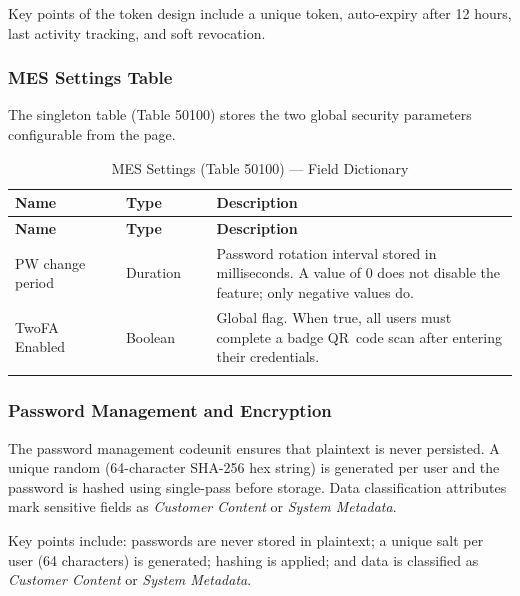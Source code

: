 Key points of the token design include a unique  token,
auto-expiry after 12 hours, last activity tracking, and soft revocation.

\subsubsection*{MES Settings Table}

The  singleton table (Table 50100) stores the two global
security parameters configurable from the  page.

\begin{longtable}{@{} P{0.22\linewidth} P{0.18\linewidth} P{0.60\linewidth} @{}}

	\toprule
	\textbf{Name} & \textbf{Type} & \textbf{Description} \\
	\midrule
	\endfirsthead

	\toprule
	\textbf{Name} & \textbf{Type} & \textbf{Description} \\
	\midrule
	\endhead

	

	\endlastfoot

	PW change period  & Duration &
	Password rotation interval stored in milliseconds. A value of 0 does not disable the feature; only negative values do. \\
	\midrule

	TwoFA Enabled & Boolean &
	Global flag. When true, all users must complete a badge QR~code scan after entering their credentials. \\
	\midrule
	\noalign{\vskip 4pt}
	\caption{MES Settings (Table 50100) --- Field Dictionary}
	\label{tab:s1-mes_settings_fields}

\end{longtable}


\subsubsection*{Password Management and Encryption}

The password management codeunit ensures that plaintext is never persisted. A
unique random  (64-character SHA-256 hex string) is generated per
user and the password is hashed using single-pass  before storage.
Data classification attributes mark sensitive fields as \emph{Customer Content}
or \emph{System Metadata}.

Key points include: passwords are never stored in plaintext; a unique salt per user
(64 characters) is generated;  hashing is applied; and data is
classified as \emph{Customer Content} or \emph{System Metadata}.

